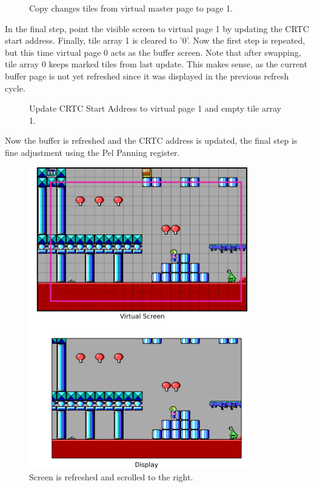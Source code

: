 \documentclass[book.tex]{subfiles}
\begin{document}
\begin{figure}[H]
\centering
 \caption{Copy changes tiles from virtual master page to page 1.}
 \label{fig:kc1_3_step2}
\end{figure}


\pagebreak
In the final step, point the visible screen to virtual page 1 by updating the CRTC start address. Finally, tile array 1 is cleared to '0'. Now the first step is repeated, but this time virtual page 0 acts as the buffer screen. Note that after swapping, tile array 0 keeps marked tiles from last update. This makes sense, as the current buffer page is not yet refreshed since it was displayed in the previous refresh cycle. 

\begin{figure}[H]
\centering
 \caption{Update CRTC Start Address to virtual page 1 and empty tile array 1.}
 \label{fig:kc1_3_step2}
\end{figure}

\pagebreak

Now the buffer is refreshed and the CRTC address is updated, the final step is fine adjustment using the Pel Panning register.
\begin{figure}[H]
\centering
 \includegraphics[width=0.85\textwidth]{screenshots_300dpi/game/Keen_ATR_1-3_b.png}
 \caption{Screen is refreshed and scrolled to the right.}
 \label{fig:kc1_3_start}
\end{figure}
\end{document}
